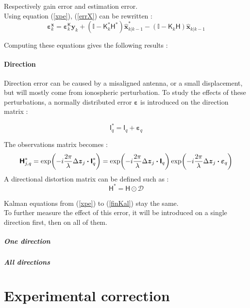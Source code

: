 \documentclass[titlepage]{article}
\renewcommand{\H}{\boldsymbol{\mathsf{H}}}
\newcommand{\I}{\boldsymbol{\mathsf{I}}}
\newcommand{\K}{\boldsymbol{\mathsf{K}}}
\newcommand{\x}{\boldsymbol{x}}
\newcommand{\y}{\boldsymbol{y}}
\newcommand{\dz}{\Delta\boldsymbol{z}}
\newcommand{\xp}{\widehat{\x}_{k|k-1}}
\newcommand{\vbeps}{\boldsymbol{\varepsilon}}
\newcommand{\D}{\mathcal{D}}
\begin{document}
	Respectively gain error and estimation error.\\
	Using equation (\ref{xpe}), (\ref{errX}) can be rewritten :
	\begin{equation}
		\vbeps^{\x}_k = \vbeps^{\K}_k\y_k + \left(\mathbb{I} - \K_k^*\H^*\right)\xp^* - \left(\mathbb{I} - \K_k\H\right)\xp
	\end{equation}
	
	Computing these equations gives the following results :
	
	
	
	
	\subsection{Direction}
	
	Direction error can be caused by a misaligned antenna, or a small displacement, but will mostly come from ionospheric perturbation\cite{iono}. To study the effects of these perturbations, a normally distributed error $\vbeps$ is introduced on the direction matrix :
	
	\begin{equation}
		\I_q^* = \I_q + \vbeps_q
	\end{equation}

	The observations matrix becomes :
	$$
		\H_{j,q}^* = \exp(-i\frac{2\pi}{\lambda}\dz_{j}\dotproduct\I_q^*) = \exp(-i\frac{2\pi}{\lambda}\dz_{j}\dotproduct\I_q)\exp(-i\frac{2\pi}{\lambda}\dz_{j}\dotproduct\vbeps_q)
	$$
	A directional distortion matrix can be defined such as :
	\begin{equation}
		\H^* = \H \odot \D
	\end{equation}

	Kalman equations from (\ref{xpe}) to (\ref{finKal}) stay the same.\\
	
	To further measure the effect of this error, it will be introduced on a single direction first, then on all of them. 
	
	\subsubsection{One direction}
	
	\subsubsection{All directions}
	
	\newpage
	\part{Experimental correction}
\end{document}
